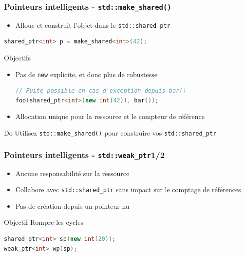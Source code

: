 \documentclass[C++.tex]{subfiles}
\begin{document}
\begin{frame}[fragile]
	\frametitle{Pointeurs intelligents - \lstinline|std::make_shared()|}
	\begin{itemize}
		\item Alloue et construit l'objet dans le \lstinline|std::shared_ptr|
	\end{itemize}

	\begin{lstlisting}[language=C++]
shared_ptr<int> p = make_shared<int>(42);\end{lstlisting}

	\begin{block}{Objectifs}
		\begin{itemize}
			\item Pas de \lstinline|new| explicite, et donc plus de robustesse


			\begin{lstlisting}[language=C++]
// Fuite possible en cas d'exception depuis bar()
foo(shared_ptr<int>(new int(42)), bar());\end{lstlisting}

			\item Allocation unique pour la ressource et le compteur de référence
		\end{itemize}
	\end{block}

	\begin{exampleblock}{Do}
		Utilisez \lstinline|std::make_shared()| pour construire vos \lstinline|std::shared_ptr|
	\end{exampleblock}
\end{frame}

\begin{frame}[fragile]
	\frametitle{Pointeurs intelligents - \lstinline|std::weak_ptr|\titlehfill{}1/2}
	\begin{itemize}
		\item Aucune responsabilité sur la ressource
		\item Collabore avec \lstinline|std::shared_ptr| sans impact sur le comptage de références
		\item Pas de création depuis un pointeur nu
	\end{itemize}

	\begin{block}{Objectif}
		Rompre les cycles 
	\end{block}

	\begin{lstlisting}[language=C++]
shared_ptr<int> sp(new int(20));
weak_ptr<int> wp(sp);\end{lstlisting}
\end{frame}
\end{document}
